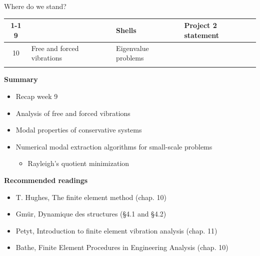 \documentclass[aspectratio=169]{beamer}
\begin{document}
{\begin{frame}{Where do we stand?}
\begin{center}
\begin{tabular}{|c|l|l|l|}
        \cline{1-1} \cline{3-4}
        9                                  &                                                & Shells                             & Project 2 statement    \\
        \hline
        10                                 & \multirow{1}{7em}{Free and forced vibrations}  & Eigenvalue problems                &                        \\
                                           &                                                &                                    &                        \\
        \hline
      \end{tabular}
    \end{center}
    \vspace{1cm}
  \end{frame}

  \begin{frame}
    \textbf{\large Summary}
    \begin{itemize}
      \item Recap week 9
      \item Analysis of free and forced vibrations
      \item Modal properties of conservative systems
      \item Numerical modal extraction algorithms for small-scale problems
            \begin{itemize}
              \item Rayleigh's quotient minimization
            \end{itemize}
    \end{itemize}
    \vspace{.5cm}

    \textbf{\large Recommended readings}
    \begin{itemize}
      \item[(H)] T. Hughes, The finite element method (chap. 10)
      \item[(G)] Gmür, Dynamique des structures (§4.1 and §4.2)
      \item[(P)] Petyt, Introduction to finite element vibration analysis (chap. 11)
      \item[(B)] Bathe, Finite Element Procedures in Engineering Analysis (chap. 10)
    \end{itemize}
  \end{frame}
}
\end{document}

